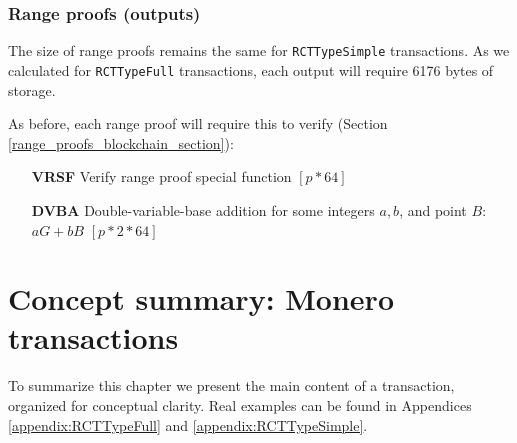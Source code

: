 \subsubsection*{Range proofs (outputs)}

The size of range proofs remains the same for {\tt RCTTypeSimple} transactions. As we calculated for {\tt RCTTypeFull} transactions, each output will require 6176 bytes of storage.

As before, each range proof will require this to verify (Section \ref{range_proofs_blockchain_section}):

\begin{itemize}
    \setlength\itemsep{\listspace}
    \item [\textbf{VRSF}] Verify range proof special function \quad \([p*64]\)
    \item [\textbf{DVBA}] Double-variable-base addition for some integers $a, b$, and point $B$: $a G + b B$ \quad \([p*2*64]\)
\end{itemize}


\newpage
\section{Concept summary: Monero transactions}
\label{sec:transaction_summary}

To summarize this chapter we present the main content of a transaction, organized for conceptual clarity. Real examples can be found in Appendices \ref{appendix:RCTTypeFull} and \ref{appendix:RCTTypeSimple}.

